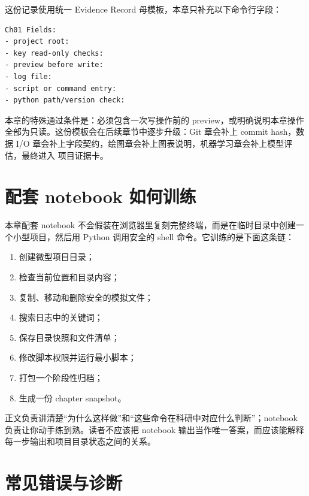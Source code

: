 这份记录使用统一 Evidence Record 母模板，本章只补充以下命令行字段：

\begin{examplebox}
\begin{lstlisting}[style=terminal]
Ch01 Fields:
- project root:
- key read-only checks:
- preview before write:
- log file:
- script or command entry:
- python path/version check:
\end{lstlisting}
\end{examplebox}

本章的特殊通过条件是：必须包含一次写操作前的 preview，或明确说明本章操作全部为只读。这份模板会在后续章节中逐步升级：Git 章会补上 commit hash，数据 I/O 章会补上字段契约，绘图章会补上图表说明，机器学习章会补上模型评估，最终进入 项目证据卡。

\section{配套 notebook 如何训练}

本章配套 notebook 不会假装在浏览器里复刻完整终端，而是在临时目录中创建一个小型项目，然后用 Python 调用安全的 shell 命令。它训练的是下面这条链：

\begin{enumerate}
    \item 创建微型项目目录；
    \item 检查当前位置和目录内容；
    \item 复制、移动和删除安全的模拟文件；
    \item 搜索日志中的关键词；
    \item 保存目录快照和文件清单；
    \item 修改脚本权限并运行最小脚本；
    \item 打包一个阶段性归档；
    \item 生成一份 chapter snapshot。
\end{enumerate}

正文负责讲清楚“为什么这样做”和“这些命令在科研中对应什么判断”；notebook 负责让你动手练到熟。读者不应该把 notebook 输出当作唯一答案，而应该能解释每一步输出和项目目录状态之间的关系。

\section{常见错误与诊断}


